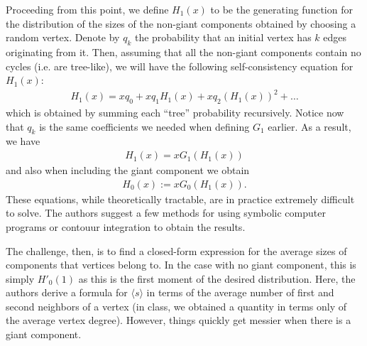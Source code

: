 \documentclass{letter}
\begin{document}
{    Proceeding from this point, we define $H_1(x)$ to be the generating function for the distribution of the sizes of the non-giant components obtained by choosing a random vertex. Denote by $q_k$ the probability that an initial vertex has $k$ edges originating from it. Then, assuming that all the non-giant components contain no cycles (i.e. are tree-like), we will have the following self-consistency equation for $H_1(x)$: \begin{align*}
        H_1(x) = xq_0 + xq_1H_1(x) + xq_2(H_1(x))^2 + \dots 
    \end{align*} which is obtained by summing each ``tree'' probability recursively. Notice now that $q_k$ is the same coefficients we needed when defining $G_1$ earlier. As a result, we have \begin{align*}
        H_1(x) = xG_1(H_1(x))
    \end{align*} and also when including the giant component we obtain \begin{align*}
        H_0(x) := xG_0(H_1(x)).
    \end{align*} These equations, while theoretically tractable, are in practice extremely difficult to solve. The authors suggest a few methods for using symbolic computer programs or contouur integration to obtain the results.
    
    The challenge, then, is to find a closed-form expression for the average sizes of components that vertices belong to. In the case with no giant component, this is simply $H'_0(1)$ as this is the first moment of the desired distribution. Here, the authors derive a formula for $\langle s \rangle$ in terms of the average number of first and second neighbors of a vertex (in class, we obtained a quantity in terms only of the average vertex degree). However, things quickly get messier when there is a giant component.}
\end{document}
